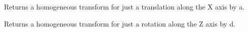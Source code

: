 \documentclass[letterpaper,10pt,english,openany,oneside]{sphinxmanual}
\begin{document}

\begin{fulllineitems}
\label{\detokenize{Inverse_Kinematics:Inverse_Kinematics.trans_x}}
Returns a homogeneous transform for just a translation along the X axis by a.

\end{fulllineitems}


\begin{fulllineitems}
\label{\detokenize{Inverse_Kinematics:Inverse_Kinematics.trans_z}}
Returns a homogeneous transform for just a rotation along the Z axis by d.

\end{fulllineitems}
\end{document}

